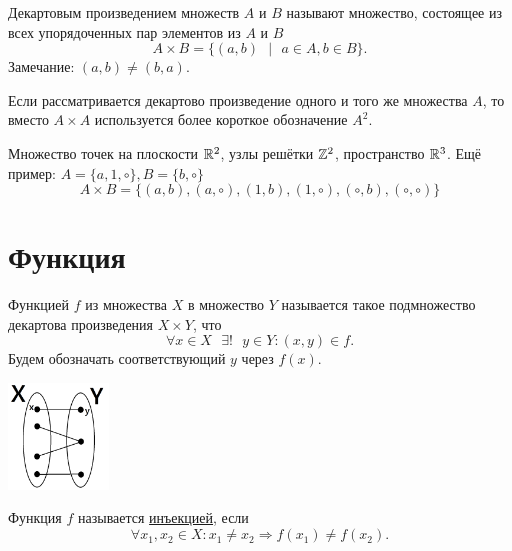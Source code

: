 	\begin{definition}
		Декартовым произведением множеств $A$ и $B$ называют множество, состоящее из всех упорядоченных пар элементов из $A$ и $B$
		\[ A \times B = \{(a, b) \text{ } | \text{ } a \in A, b \in B\}. \]
		Замечание: $(a, b) \neq (b, a)$.
	\end{definition}
	
	\begin{mention}
		Если рассматривается декартово произведение одного и того же множества $A$, то вместо $A \times A$ используется более короткое обозначение $A^2$.
	\end{mention}
	
	\begin{example}
		Множество точек на плоскости $\mathbb R^2$, узлы решётки $\mathbb Z^2$, пространство $\mathbb R^3$. Ещё пример: $A = \{a, 1, \circ\}, B = \{b, \circ\}$
		\[ A \times B = \{ (a, b), (a, \circ), (1, b), (1, \circ), (\circ, b), (\circ, \circ) \} \]
	\end{example}
	
	\section{Функция}
	
	\begin{definition}
		Функцией $f$ из множества $X$ в множество $Y$ называется такое подмножество декартова произведения $X \times Y$, что
		\[ \forall x \in X \text{ } \exists! \text{ } y \in Y : (x, y) \in f. \]
		Будем обозначать соответствующий $y$ через $f(x)$.
	\end{definition}
	
	\begin{center}
		\includegraphics[width=0.2\textwidth]{img/lecture1/function}
	\end{center}
	
	\begin{definition}
		Функция $f$ называется \underline{инъекцией}, если
		\[ \forall x_1, x_2 \in X : x_1 \neq x_2 \Rightarrow f(x_1) \neq f(x_2). \]
	\end{definition}
	
